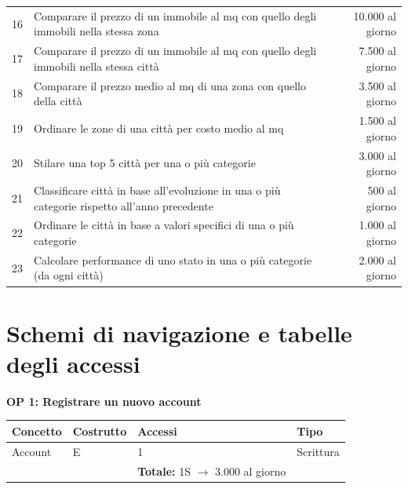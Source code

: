 \documentclass[a4paper,12pt]{report}
\begin{document}
\begin{table}[H]
\begin{adjustbox}{width=1.45\textwidth,center}
\begin{tabular}{clr}
             16 & Comparare il prezzo di un immobile al mq con quello degli immobili nella stessa zona & 10.000 al giorno \\
             17 & Comparare il prezzo di un immobile al mq con quello degli immobili nella stessa città & 7.500 al giorno \\
             18 & Comparare il prezzo medio al mq di una zona con quello della città & 3.500 al giorno \\ 
             19 & Ordinare le zone di una città per costo medio al mq & 1.500 al giorno \\
             20 & Stilare una top 5 città per una o più categorie & 3.000 al giorno \\
             21 & Classificare città in base all'evoluzione in una o più categorie rispetto all'anno precedente & 500 al giorno \\ 
             22 & Ordinare le città in base a valori specifici di una o più categorie & 1.000 al giorno \\ 
             23 & Calcolare performance di uno stato in una o più categorie (da ogni città) & 2.000 al giorno \\ [1ex]
            \end{tabular}
            \end{adjustbox}
            \end{table}
        	
    	\section{Schemi di navigazione e tabelle degli accessi}
        	

        \textbf{OP 1: Registrare un nuovo account}
        	\begin{table}[H]
            \centering
             \begin{tabular}{llll}
             \rowcolor{yellow!20}\textbf{Concetto} & \textbf{Costrutto} & \textbf{Accessi} & \textbf{Tipo} \\ [0.5ex] 
             \hline
             Account & E & 1 & Scrittura \\ 
             \hline
             \rowcolor{yellow!20}\rowcolor{yellow!20} &   & \textbf{Totale:} 1S $\rightarrow$ 3.000 al giorno &  \\ [1ex] 
             \end{tabular}
            \end{table}
\end{document}
